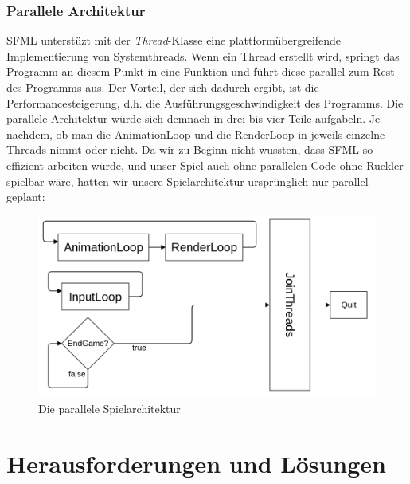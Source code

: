 \documentclass[11pt,a4paper]{scrbook}
\begin{document}
\subsection{Parallele Architektur}
SFML unterstüzt mit der \textit{Thread}-Klasse eine plattformübergreifende Implementierung
von Systemthreads. Wenn ein Thread erstellt wird, springt das Programm an diesem Punkt
in eine Funktion und führt diese parallel zum Rest des Programms aus. Der Vorteil,
der sich dadurch ergibt, ist die Performancesteigerung, d.h. die Ausführungsgeschwindigkeit des Programms. Die
parallele Architektur würde sich demnach in drei bis vier Teile aufgabeln. Je nachdem, ob man die AnimationLoop
und die RenderLoop in jeweils einzelne Threads nimmt oder nicht. Da wir zu Beginn
nicht wussten, dass SFML so effizient arbeiten würde, und unser Spiel auch ohne parallelen Code
ohne Ruckler spielbar wäre, hatten wir unsere Spielarchitektur ursprünglich nur parallel geplant:
\\
\begin{figure}[h]
\centering
\includegraphics[scale=0.3]{img/threads.png}
\caption{Die parallele Spielarchitektur}
\end{figure}


\chapter{Herausforderungen und Lösungen}     
\end{document}
